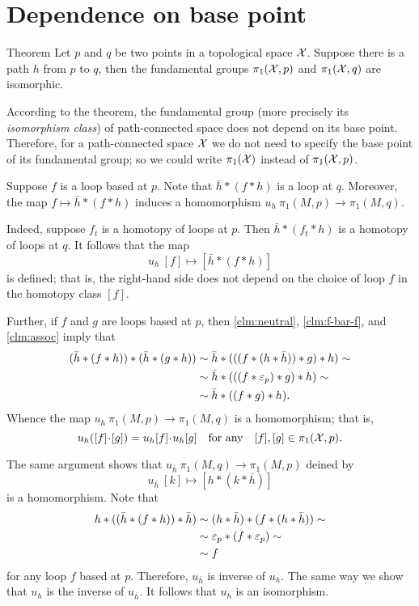 \section{Dependence on base point}

\begin{thm}{Theorem}
Let $p$ and $q$ be two points in a topological space $\mathcal{X}$.
Suppose there is a path $h$ from $p$ to $q$, then 
the fundamental groups $\pi_1(\mathcal{X},p)$ and $\pi_1(\mathcal{X},q)$ are isomorphic.
\end{thm}

According to the theorem, the fundamental group (more precisely its \textit{isomorphism class}) of path-connected space does not depend on its base point.
Therefore, for a path-connected space $\mathcal{X}$ we do not need to specify the base point of its fundamental group; so we could write $\pi_1(\mathcal{X})$ instead of $\pi_1(\mathcal{X},p)$.

Suppose $f$ is a loop based at $p$.
Note that $\bar h*(f*h)$ is a loop at $q$.
Moreover, the map $f\mapsto \bar h*(f*h)$ induces a homomorphism $u_h\:\pi_1(M,p)\to\pi_1(M,q)$.

Indeed, suppose $f_t$ is a homotopy of loops at $p$.
Then $\bar h*(f_t*h)$ is a homotopy of loops at $q$.
It follows that the map 
\[u_h\:[f]\mapsto [\bar h*(f*h)]\]
is defined; that is, the right-hand side does not depend on the choice of loop $f$ in the homotopy class $[f]$. 

Further, if $f$ and $g$ are loops based at $p$, then \ref{clm:neutral}, \ref{clm:f-bar-f}, and  \ref{clm:assoc} imply that
\begin{align*}
(\bar h*(f*h))*(\bar h*(g*h))&\sim \bar h*(((f*(h*\bar h))*g)*h)\sim
\\
&\sim \bar h*(((f*\varepsilon_p)*g)*h)\sim 
\\
&\sim \bar h*((f*g)*h).
\end{align*}
Whence the map $u_h\:\pi_1(M,p)\to \pi_1(M,q)$ is a homomorphism;
that is, 
\[u_h([f]\cdot [g])=u_h[f]\cdot u_h[g]\quad\text{for any}\quad [f],[g]\in \pi_1(\c{X},p).\]

The same argument shows that $u_{\bar h}\: \pi_1(M,q)\to \pi_1(M,p)$ deined by 
\[u_{\bar h}\:[k]\mapsto [h*(k*\bar h)]\]
is a homomorphism.
Note that 
\begin{align*}
h*((\bar h*(f*h))*\bar h)&\sim (h*\bar h)*(f*(h*\bar h))\sim
\\
&\sim \varepsilon_p*(f*\varepsilon_p)\sim
\\
&\sim f
\end{align*}
for any loop $f$ based at $p$.
Therefore, $u_{\bar h}$ is inverse of $u_h$.
The same way we show that $u_{h}$ is the inverse of $u_{\bar h}$.
It follows that $u_h$ is an isomorphism.
\qeds

